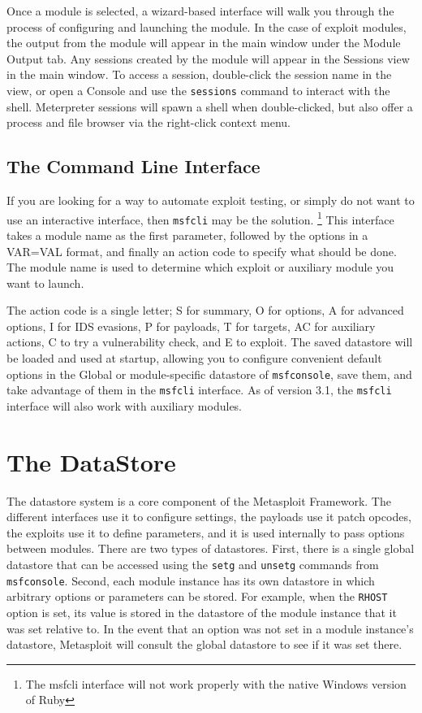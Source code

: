\documentclass{report}
\begin{document}
\par
Once a module is selected, a wizard-based interface will walk you through the
process of configuring and launching the module. In the case of exploit modules,
the output from the module will appear in the main window under the Module
Output tab. Any sessions created by the module will appear in the Sessions view
in the main window. To access a session, double-click the session name in the
view, or open a Console and use the \texttt{sessions} command to interact with
the shell. Meterpreter sessions will spawn a shell when double-clicked, but also
offer a process and file browser via the right-click context menu.

    \section{The Command Line Interface}
    \label{STARTED-CLI}

\par
If you are looking for a way to automate exploit testing, or simply do not want
to use an interactive interface, then \texttt{msfcli} may be the solution.
\footnote{The msfcli interface will not work properly with the native Windows
version of Ruby} This interface takes a module name as the first parameter,
followed by the options in a VAR=VAL format, and finally an action code to
specify what should be done. The module name is used to determine which exploit
or auxiliary module you want to launch.

\par
The action code is a single letter; S for summary, O for options, A for advanced
options, I for IDS evasions, P for payloads, T for targets, AC for auxiliary
actions, C to try a vulnerability check, and E to exploit. The saved datastore
will be loaded and used at startup, allowing you to configure convenient default
options in the Global or module-specific datastore of \texttt{msfconsole}, save
them, and take advantage of them in the \texttt{msfcli} interface. As of version
3.1, the \texttt{msfcli} interface will also work with auxiliary modules.

\pagebreak

\chapter{The DataStore}

\par
The datastore system is a core component of the Metasploit Framework. The
different interfaces use it to configure settings, the payloads use it patch
opcodes, the exploits use it to define parameters, and it is used internally to
pass options between modules. There are two types of datastores. First, there is
a single global datastore that can be accessed using the \texttt{setg} and
\texttt{unsetg} commands from \texttt{msfconsole}. Second, each module instance
has its own datastore in which arbitrary options or parameters can be stored.
For example, when the \texttt{RHOST} option is set, its value is stored in the
datastore of the module instance that it was set relative to. In the event that
an option was not set in a module instance's datastore, Metasploit will consult
the global datastore to see if it was set there.
\end{document}
